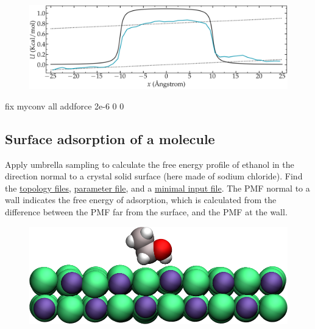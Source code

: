 \begin{figure}
\includegraphics[width=\linewidth]{tutorials/level3/free-energy-calculation/exercice-convection-light.png}
\end{figure}

\begin{tcolorbox}[colback=mylightblue!5!white,colframe=mylightblue!75!black,title=Solution]

\begin{lcverbatim}
fix myconv all addforce 2e-6 0 0
\end{lcverbatim}

\noindent \end{tcolorbox}

\subsection{Surface adsorption of a molecule}

\noindent Apply umbrella sampling to calculate the free energy profile
of ethanol in the direction normal to a crystal solid surface (here made of sodium chloride). 
Find the \href{../../../../../inputs/level3/free-energy-calculation/Exercises/MoleculeAdsorption/system/}{topology files}, \href{../../../../../inputs/level3/free-energy-calculation/Exercises/MoleculeAdsorption/PARM.lammps}{parameter file}, and a \href{../../../../../inputs/level3/free-energy-calculation/Exercises/MoleculeAdsorption/input-minimalist.lammps}{minimal input file}.
The PMF normal to a wall indicates the free energy of adsorption, which is
calculated from the difference between the PMF far from the surface, and the 
PMF at the wall.

\begin{figure}
\includegraphics[width=\linewidth]{tutorials/level3/free-energy-calculation/ethanol-light.png}
\end{figure}

